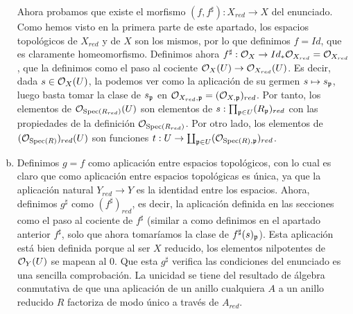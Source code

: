 \documentclass[twoside]{article}
\begin{document}
\begin{solucion}
\begin{enumerate}[(a)]
Ahora probamos que existe el morfismo $(f,f^{\sharp}):X_{red}\to X$ del enunciado. Como hemos visto en la primera parte de este apartado, los espacios topológicos de $X_{red}$ y de $X$ son los mismos, por lo que definimos $f=Id$, que es claramente homeomorfismo. Definimos ahora $f^{\sharp}:{\mathcal O}_{X}\to Id_*{\mathcal O}_{X_{red}}={\mathcal O}_{X_{red}}$, que la definimos como el paso al cociente ${\mathcal O}_{X}(U)\to{\mathcal O}_{X_{red}}(U)$. Es decir, dada $s\in {\mathcal O}_X(U)$, la podemos ver como la aplicación de su germen $s\mapsto s_{\mathfrak{p}}$, luego basta tomar la clase de $s_{\mathfrak{p}}$ en ${\mathcal O}_{X_{red}, \mathfrak{p}}=({\mathcal O}_{X,\mathfrak{p}})_{red}$.
Por tanto, los elementos de ${\mathcal O}_{\operatorname{Spec}(R_{red})}(U)$ son elementos de $s:\prod_{\mathfrak{p}\in U}(R_{\mathfrak{p}})_{red}$ con las propiedades de la definición ${\mathcal O}_{\operatorname{Spec}(R_{red})}$. Por otro lado, los elementos de $({\mathcal O}_{\operatorname{Spec}(R)})_{red}(U)$ son funciones $t:U\to \coprod_{\mathfrak{p}\in U}({\mathcal O}_{\operatorname{Spec}(R),\mathfrak{p}})_{red}$.

\item Definimos $g=f$ como aplicación entre espacios topológicos, con lo cual es claro que como aplicación entre espacios topológicas es única, ya que la aplicación natural $Y_{red}\to Y$ es la identidad entre los espacios. Ahora, definimos $g^{\sharp}$ como $(f^{\sharp})_{red}$, es decir, la aplicación definida en las secciones como el paso al cociente de $f^{\sharp}$ (similar a como definimos en el apartado anterior $f^{\sharp}$, solo que ahora tomaríamos la clase de $f^{\sharp}(s)_{\mathfrak{p}}$). Esta aplicación está bien definida porque al ser $X$ reducido, los elementos nilpotentes de ${\mathcal O}_Y(U)$ se mapean al 0. Que esta $g^{\sharp}$ verifica las condiciones del enunciado es una sencilla comprobación. La unicidad se tiene del resultado de álgebra conmutativa de que una aplicación de un anillo cualquiera $A$ a un anillo reducido $R$ factoriza de modo único a través de $A_{red}$. 
\end{enumerate}
\end{solucion}

\newpage
\end{document}
